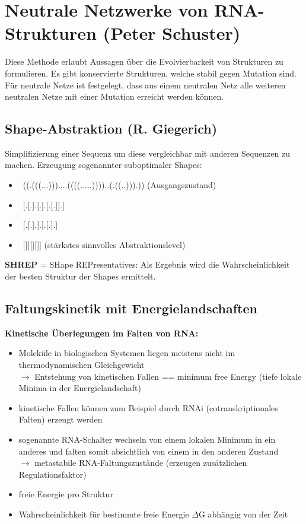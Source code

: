 \section{Neutrale Netzwerke von RNA-Strukturen (Peter Schuster)}

Diese Methode erlaubt Aussagen über die Evolvierbarkeit von Strukturen zu formulieren. Es gibt konservierte Strukturen, welche stabil gegen Mutation sind. Für neutrale Netze ist festgelegt, dass aus einem neutralen Netz alle weiteren neutralen Netze mit einer Mutation erreicht werden können.

\subsection{Shape-Abstraktion (R. Giegerich)}

Simplifizierung einer Sequenz um diese vergleichbar mit anderen Sequenzen zu machen. Erzeugung sogenannter suboptimaler Shapes:
\begin{itemize}
\item \ ((.(((...)))....((((.....))))..(.((..))).)) (Ausgangszustand)
\item \ [.[.].[.].[.[.]].]
\item \ [.[.].[.].[.].] 
\item \ [[][][]] (stärkstes sinnvolles Abstraktionslevel)
\end{itemize}

\textbf{SHREP} = SHape REPresentatives: Als Ergebnis wird die Wahrscheinlichkeit der besten Struktur der Shapes ermittelt.

\subsection{Faltungskinetik mit Energielandschaften}
\textbf{Kinetische Überlegungen im Falten von RNA:}
\begin{itemize}
\item Moleküle in biologischen Systemen liegen meistens nicht im thermodynamischen Gleichgewicht \\
$\rightarrow$ Entstehung von kinetischen Fallen == minimum free Energy (tiefe lokale Minima in der Energielandschaft)
\item kinetische Fallen können zum Beispiel durch RNAi (cotranskriptionales Falten) erzeugt werden
\item sogenannte RNA-Schalter wechseln von einem lokalen Minimum in ein anderes und falten somit absichtlich von einem in den anderen Zustand \\ $\rightarrow$ metastabile RNA-Faltungszustände (erzeugen zusätzlichen Regulationsfaktor)
\item freie Energie pro Struktur
\item Wahrscheinlichkeit für bestimmte freie Energie $\Delta$G abhängig von der Zeit
\end{itemize}

